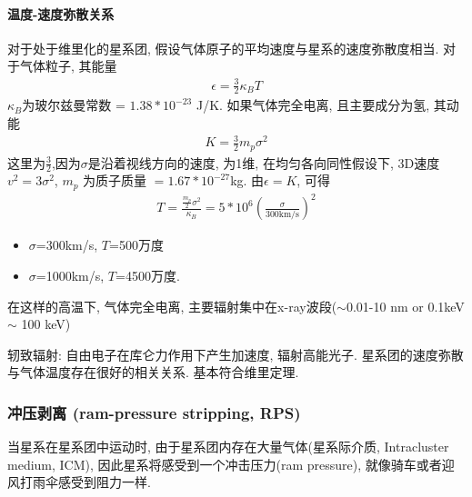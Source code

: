 \paragraph{温度-速度弥散关系}
对于处于维里化的星系团, 假设气体原子的平均速度与星系的速度弥散度相当. 对于气体粒子, 其能量
\begin{align*}
    \epsilon=\frac{3}{2}\kappa_B T
\end{align*}
$\kappa_B$为玻尔兹曼常数 = $1.38*10^{-23} $ J/K. 如果气体完全电离, 且主要成分为氢, 其动能
\begin{align*}
    K=\frac{3}{2}m_p\sigma^2
\end{align*}
这里为$\frac{3}{2}$,因为$\sigma$是沿着视线方向的速度, 为1维, 在均匀各向同性假设下, 3D速度 $v^2= 3\sigma^2$, $m_p$ 为质子质量 $= 1.67 * 10^{-27} $kg. 由$\epsilon=K$, 可得
\begin{align*}
    T=\frac{\frac{m_p}{2}\sigma^2}{\kappa_B}=5*10^6\left( \frac{\sigma}{300\text{km/s}} \right)^2
\end{align*}
\begin{itemize}\small
    \item $\sigma$=300km/s, $T$=500万度
    \item $\sigma$=1000km/s, $T$=4500万度. 
\end{itemize}
在这样的高温下, 气体完全电离, 主要辐射集中在x-ray波段($\sim$0.01-10 nm or 0.1keV $\sim$ 100 keV)

轫致辐射: 自由电子在库仑力作用下产生加速度, 辐射高能光子. 星系团的速度弥散与气体温度存在很好的相关关系. 基本符合维里定理. 


\subsubsection{冲压剥离 (ram-pressure stripping, RPS)}
当星系在星系团中运动时, 由于星系团内存在大量气体(星系际介质, Intracluster medium, ICM), 因此星系将感受到一个冲击压力(ram pressure), 就像骑车或者迎风打雨伞感受到阻力一样. 

\begin{figure}[!htb]
    \centering
\end{figure}

